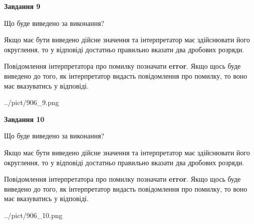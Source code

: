\documentclass[12pt, ukrainian]{article}
\begin{document}
{\begin {Large}
{\begin {center}\textbf{Завдання 9}\end {center}}\par
Що буде виведено за виконання? \par

Якщо має бути виведено дійсне значення та інтерпретатор має здійснювати його округлення, 
то у відповіді достатньо правильно вказати два дробових розряди.

Повідомлення інтерпретатора про помилку позначати \textbf{error}.
Якщо щось буде виведено до того, як інтерпретатор видасть повідомлення про помилку, 
то воно має вказуватись у відповіді. \par

\begin{center}
	{../pict/906_9.png}
\end{center}
\newpage

{\begin {center}\textbf{Завдання 10}\end {center}}\par
Що буде виведено за виконання? \par

Якщо має бути виведено дійсне значення та інтерпретатор має здійснювати його округлення, 
то у відповіді достатньо правильно вказати два дробових розряди.

Повідомлення інтерпретатора про помилку позначати \textbf{error}.
Якщо щось буде виведено до того, як інтерпретатор видасть повідомлення про помилку, 
то воно має вказуватись у відповіді. \par

\begin{center}
	{../pict/906_10.png}
\end{center}
\newpage

\end {Large}}
\end{document}
